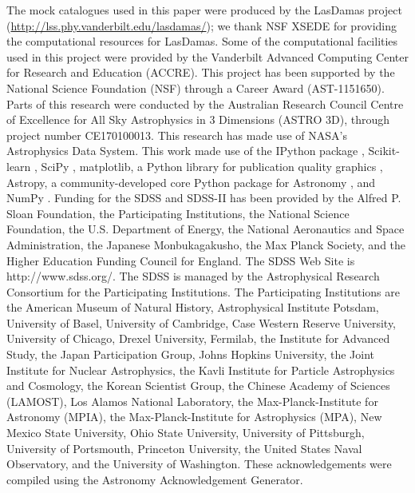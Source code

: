 The mock catalogues used in this paper were produced by the LasDamas project 
(\url{http://lss.phy.vanderbilt.edu/lasdamas/}); we thank NSF XSEDE for 
providing the computational resources for LasDamas. Some of the 
computational facilities used in this project were provided by the 
Vanderbilt Advanced Computing Center for Research and Education (ACCRE). 
This project has been supported by the National Science Foundation (NSF) 
through a Career Award (AST-1151650). 
Parts of this research were conducted by the Australian Research Council 
Centre of Excellence for All Sky Astrophysics in 3 Dimensions (ASTRO 3D), 
through project number CE170100013.
This research has made use of 
NASA's Astrophysics Data System. This work made use of the IPython package 
\citep{Perez2007}, Scikit-learn \citep{McKinney2010}, SciPy 
\citep{jones_scipy_2001}, matplotlib, a Python library for publication 
quality graphics \citep{Hunter:2007}, Astropy, a community-developed 
core Python package for Astronomy \citep{AstropyCollaboration2013}, and 
NumPy \citep{VanDerWalt2011}. Funding for the SDSS and SDSS-II has been 
provided by the Alfred P. Sloan Foundation, the Participating Institutions, 
the National Science Foundation, the U.S. Department of Energy, 
the National Aeronautics and Space Administration, the 
Japanese Monbukagakusho, the Max Planck Society, and the Higher Education 
Funding Council for England. The SDSS Web Site is http://www.sdss.org/. 
The SDSS is managed by the Astrophysical Research Consortium for the 
Participating Institutions. The Participating Institutions are the 
American Museum of Natural History, Astrophysical Institute Potsdam, 
University of Basel, University of Cambridge, Case Western Reserve 
University, University of Chicago, Drexel University, Fermilab, the 
Institute for Advanced Study, the Japan Participation Group, 
Johns Hopkins University, the Joint Institute for Nuclear Astrophysics, 
the Kavli Institute for Particle Astrophysics and Cosmology, 
the Korean Scientist Group, the Chinese Academy of Sciences (LAMOST), 
Los Alamos National Laboratory, the Max-Planck-Institute for Astronomy (MPIA), 
the Max-Planck-Institute for Astrophysics (MPA), 
New Mexico State University, Ohio State University, 
University of Pittsburgh, University of Portsmouth, Princeton University, 
the United States Naval Observatory, and the University of Washington. 
These acknowledgements were compiled using the Astronomy Acknowledgement 
Generator.